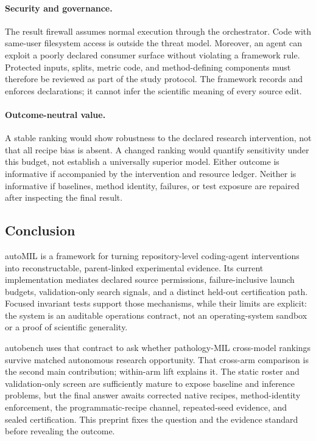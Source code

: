 \documentclass{article}
\newcommand{\ours}{\textsf{autoMIL}\xspace}
\newcommand{\autobench}{\textsf{autobench}\xspace}
\begin{document}
\paragraph{Security and governance.}
The result firewall assumes normal execution through the orchestrator.  Code
with same-user filesystem access is outside the threat model.  Moreover, an
agent can exploit a poorly declared consumer surface without violating a
framework rule.  Protected inputs, splits, metric code, and method-defining
components must therefore be reviewed as part of the study protocol.  The
framework records and enforces declarations; it cannot infer the scientific
meaning of every source edit.

\paragraph{Outcome-neutral value.}
A stable ranking would show robustness to the declared research intervention,
not that all recipe bias is absent.  A changed ranking would quantify
sensitivity under this budget, not establish a universally superior model.
Either outcome is informative if accompanied by the intervention and resource
ledger.  Neither is informative if baselines, method identity, failures, or
test exposure are repaired after inspecting the final result.

\subsection{Conclusion}

\ours is a framework for turning repository-level coding-agent interventions
into reconstructable, parent-linked experimental evidence.  Its current
implementation mediates declared source permissions, failure-inclusive launch
budgets, validation-only search signals, and a distinct held-out certification
path.  Focused invariant tests support those mechanisms, while their limits are
explicit: the system is an auditable operations contract, not an
operating-system sandbox or a proof of scientific generality.

\autobench uses that contract to ask whether pathology-MIL cross-model rankings
survive matched autonomous research opportunity.  That cross-arm comparison is
the second main contribution; within-arm lift explains it.  The static roster
and validation-only screen are sufficiently mature to expose baseline and
inference problems, but the final answer awaits corrected native recipes,
method-identity enforcement, the programmatic-recipe channel, repeated-seed
evidence, and sealed certification.  This
preprint fixes the question and the evidence standard before revealing the
outcome.
\end{document}
